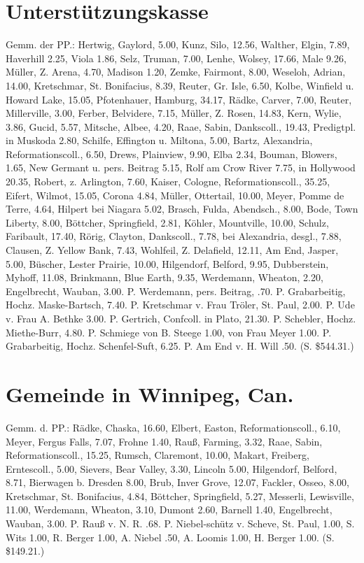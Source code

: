\section{Unterstützungskasse}
Gemm. der PP.: Hertwig, Gaylord, 5.00, Kunz, Silo, 12.56, Walther, Elgin, 7.89, Haverhill 2.25, Viola 1.86, Selz, Truman, 7.00, Lenhe, Wolsey, 17.66, Male 9.26, Müller, Z. Arena, 4.70, Madison 1.20, Zemke, Fairmont, 8.00, Weseloh, Adrian, 14.00, Kretschmar, St. Bonifacius, 8.39, Reuter, Gr. Isle, 6.50, Kolbe, Winfield u. Howard Lake, 15.05, Pfotenhauer, Hamburg, 34.17, Rädke, Carver, 7.00, Reuter, Millerville, 3.00, Ferber, Belvidere, 7.15, Müller, Z. Rosen, 14.83, Kern, Wylie, 3.86, Gucid, 5.57, Mitsche, Albee, 4.20, Raae, Sabin, Dankscoll., 19.43, Predigtpl. in Muskoda 2.80, Schilfe, Effington u. Miltona, 5.00, Bartz, Alexandria, Reformationscoll., 6.50, Drews, Plainview, 9.90, Elba 2.34, Bouman, Blowers, 1.65, New Germant u. pers. Beitrag 5.15, Rolf am Crow River 7.75, in Hollywood 20.35, Robert, z. Arlington, 7.60, Kaiser, Cologne, Reformationscoll., 35.25, Eifert, Wilmot, 15.05, Corona 4.84, Müller, Ottertail, 10.00, Meyer, Pomme de Terre, 4.64, Hilpert bei Niagara 5.02, Brasch, Fulda, Abendsch., 8.00, Bode, Town Liberty, 8.00, Böttcher, Springfield, 2.81, Köhler, Mountville, 10.00, Schulz, Faribault, 17.40, Rörig, Clayton, Dankscoll., 7.78, bei Alexandria, desgl., 7.88, Clausen, Z. Yellow Bank, 7.43, Wohlfeil, Z. Delafield, 12.11, Am End, Jasper, 5.00, Büscher, Lester Prairie, 10.00, Hilgendorf, Belford, 9.95, Dubberstein, Myhoff, 11.08, Brinkmann, Blue Earth, 9.35, Werdemann, Wheaton, 2.20, Engelbrecht, Wauban, 3.00. P. Werdemann, pers. Beitrag, .70. P. Grabarbeitig, Hochz. Maske-Bartsch, 7.40. P. Kretschmar v. Frau Tröler, St. Paul, 2.00. P. Ude v. Frau A. Bethke 3.00. P. Gertrich, Confcoll. in Plato, 21.30. P. Schebler, Hochz. Miethe-Burr, 4.80. P. Schmiege von B. Steege 1.00, von Frau Meyer 1.00. P. Grabarbeitig, Hochz. Schenfel-Suft, 6.25. P. Am End v. H. Will .50. (S. \$544.31.)

\section{Gemeinde in Winnipeg, Can.}
Gemm. d. PP.: Rädke, Chaska, 16.60, Elbert, Easton, Reformationscoll., 6.10, Meyer, Fergus Falls, 7.07, Frohne 1.40, Rauß, Farming, 3.32, Raae, Sabin, Reformationscoll., 15.25, Rumsch, Claremont, 10.00, Makart, Freiberg, Erntescoll., 5.00, Sievers, Bear Valley, 3.30, Lincoln 5.00, Hilgendorf, Belford, 8.71, Bierwagen b. Dresden 8.00, Brub, Inver Grove, 12.07, Fackler, Osseo, 8.00, Kretschmar, St. Bonifacius, 4.84, Böttcher, Springfield, 5.27, Messerli, Lewisville, 11.00, Werdemann, Wheaton, 3.10, Dumont 2.60, Barnell 1.40, Engelbrecht, Wauban, 3.00. P. Rauß v. N. R. .68. P. Niebel-schütz v. Scheve, St. Paul, 1.00, S. Wits 1.00, R. Berger 1.00, A. Niebel .50, A. Loomis 1.00, H. Berger 1.00. (S. \$149.21.)

